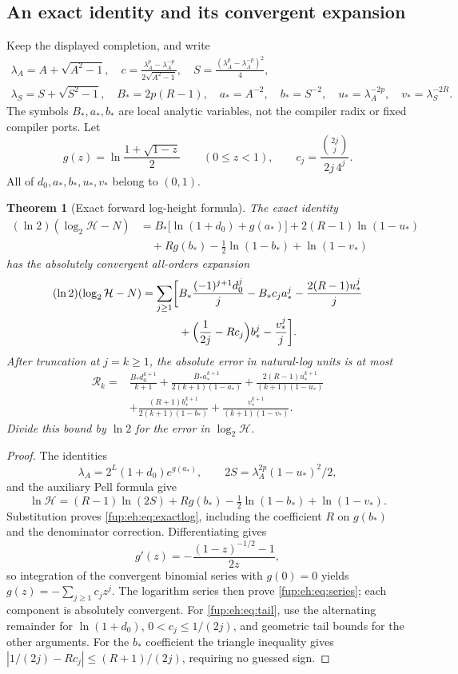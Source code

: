 \documentclass[11pt,letterpaper]{article}
\newtheorem{theorem}{Theorem}[section]
\theoremstyle{definition}\newtheorem{definition}[theorem]{Definition}
\theoremstyle{remark}\newtheorem{remark}[theorem]{Remark}
\begin{document}
\subsection{An exact identity and its convergent expansion}
Keep the displayed completion, and write
\begin{gather*}
 \lambda_A=A+\sqrt{A^2-1},\quad
 c=\frac{\lambda_A^p-\lambda_A^{-p}}{2\sqrt{A^2-1}},\quad
 S=\frac{(\lambda_A^p-\lambda_A^{-p})^2}{4},\\
 \lambda_S=S+\sqrt{S^2-1},\quad
 B_*=2p(R-1),\quad a_*=A^{-2},\quad b_*=S^{-2},\quad
 u_*=\lambda_A^{-2p},\quad v_*=\lambda_S^{-2R}.
\end{gather*}
The symbols $B_*,a_*,b_*$ are local analytic variables, not the
compiler radix or fixed compiler ports. Let
\[
 g(z)=\ln\frac{1+\sqrt{1-z}}2\qquad(0\le z<1),\qquad
 c_j=\frac{\binom{2j}{j}}{2j\,4^j}.
\]
All of $d_0,a_*,b_*,u_*,v_*$ belong to $(0,1)$.

\begin{theorem}[Exact forward log-height formula]\label{fup:eh:thm:forward}
The exact identity
\begin{align}
 (\ln2)(\log_2\mathcal H-N)
 &=B_*\bigl[\ln(1+d_0)+g(a_*)\bigr]
   +2(R-1)\ln(1-u_*)\nonumber\\
 &\quad+R g(b_*)-\tfrac12\ln(1-b_*)+\ln(1-v_*)\label{fup:eh:eq:exactlog}
\end{align}
has the absolutely convergent all-orders expansion
\begin{align}
 (\ln2)(\log_2\mathcal H-N)
 =\sum_{j\ge1}\biggl[&B_*\frac{(-1)^{j+1}d_0^j}{j}
 -B_*c_j a_*^j-\frac{2(R-1)u_*^j}{j}\nonumber\\
 &+\Bigl(\frac1{2j}-Rc_j\Bigr)b_*^j-\frac{v_*^j}{j}\biggr].
 \label{fup:eh:eq:series}
\end{align}
After truncation at $j=k\ge1$, the absolute error in natural-log
units is at most
\begin{align}
 \mathcal R_k={}&\frac{B_*d_0^{k+1}}{k+1}
 +\frac{B_*a_*^{k+1}}{2(k+1)(1-a_*)}
 +\frac{2(R-1)u_*^{k+1}}{(k+1)(1-u_*)}\nonumber\\
 &+\frac{(R+1)b_*^{k+1}}{2(k+1)(1-b_*)}
 +\frac{v_*^{k+1}}{(k+1)(1-v_*)}.\label{fup:eh:eq:tail}
\end{align}
Divide this bound by $\ln2$ for the error in $\log_2\mathcal H$.
\end{theorem}
\begin{proof}
The identities
\[
 \lambda_A=2^L(1+d_0)e^{g(a_*)},\qquad
 2S=\lambda_A^{2p}(1-u_*)^2/2,
\]
and the auxiliary Pell formula give
\[
 \ln\mathcal H=(R-1)\ln(2S)+R g(b_*)
 -\tfrac12\ln(1-b_*)+\ln(1-v_*).
\]
Substitution proves \eqref{fup:eh:eq:exactlog}, including the coefficient
$R$ on $g(b_*)$ and the denominator correction.
Differentiating gives
\[
 g'(z)=-\frac{(1-z)^{-1/2}-1}{2z},
\]
so integration of the convergent binomial series with $g(0)=0$
yields $g(z)=-\sum_{j\ge1}c_jz^j$. The logarithm series then
prove \eqref{fup:eh:eq:series}; each component is absolutely convergent.
For \eqref{fup:eh:eq:tail}, use the alternating remainder for $\ln(1+d_0)$,
$0<c_j\le1/(2j)$, and geometric tail bounds for the other arguments.
For the $b_*$ coefficient the triangle inequality gives
$|1/(2j)-Rc_j|\le(R+1)/(2j)$, requiring no guessed sign.
\end{proof}
\end{document}

